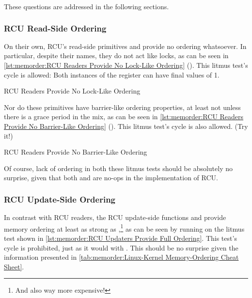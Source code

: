 These questions are addressed in the following sections.

\subsubsection{RCU Read-Side Ordering}
\label{sec:memorder:RCU Read-Side Ordering}

On their own, RCU's read-side primitives  and
 provide no ordering whatsoever.
In particular, despite their names, they do not act like locks, as can
be seen in
\cref{lst:memorder:RCU Readers Provide No Lock-Like Ordering}
().
This litmus test's cycle is allowed:
Both instances of the  register can have final values of 1.

\begin{listing}

\caption{RCU Readers Provide No Lock-Like Ordering}
\label{lst:memorder:RCU Readers Provide No Lock-Like Ordering}
\end{listing}

Nor do these primitives have barrier-like ordering properties,
at least not unless there is a grace period in the mix, as can be seen in
\cref{lst:memorder:RCU Readers Provide No Barrier-Like Ordering}
().
This litmus test's cycle is also allowed.
(Try it!)

\begin{listing}

\caption{RCU Readers Provide No Barrier-Like Ordering}
\label{lst:memorder:RCU Readers Provide No Barrier-Like Ordering}
\end{listing}

Of course, lack of ordering in both these litmus tests should be absolutely
no surprise, given that both  and 
are no-ops in the  implementation of RCU\@.

\subsubsection{RCU Update-Side Ordering}
\label{sec:memorder:RCU Update-Side Ordering}

In contrast with RCU readers, the RCU update-side functions
 and 
provide memory ordering at least as strong as ,\footnote{
	And also way more expensive!}
as can be seen by running  on the litmus test shown in
\cref{lst:memorder:RCU Updaters Provide Full Ordering}.
This test's cycle is prohibited, just as it would with .
This should be no surprise given the information presented in
\cref{tab:memorder:Linux-Kernel Memory-Ordering Cheat Sheet}.

